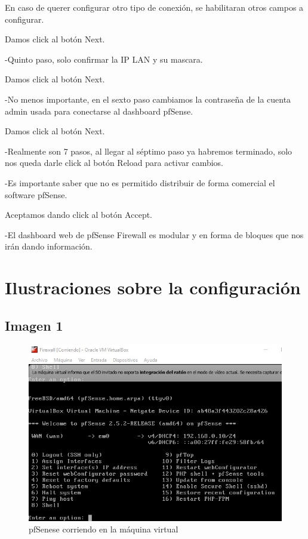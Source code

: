 \documentclass[12pt,letterspaper]{report}
\begin{document}
\vspace {0.3cm}
En caso de querer configurar otro tipo de conexión, se habilitaran otros campos a configurar.\par
\vspace {0.3cm}
Damos click al botón Next.\par
\vspace {0.3cm}
-Quinto paso, solo confirmar la IP LAN y su mascara.\par
\vspace {0.3cm}
Damos click al botón Next.\par
\vspace {0.3cm}
-No menos importante, en el sexto paso cambiamos la contraseña de la cuenta admin usada para conectarse al dashboard pfSense.\par
\vspace {0.3cm}
Damos click al botón Next.\par
\vspace {0.3cm}
-Realmente son 7 pasos, al llegar al séptimo paso ya habremos terminado, solo nos queda darle click al botón Reload para activar cambios.\par
\vspace {0.3cm}
-Es importante saber que no es permitido distribuir de forma comercial el software pfSense.\par
\vspace {0.3cm}
Aceptamos dando click al botón Accept.\par
\vspace {0.3cm}
-El dashboard web de pfSense Firewall es modular y en forma de bloques que nos irán dando información.\par
\vspace {0.3cm}

\part{Ilustraciones sobre la configuración}
\chapter*{Imagen 1}
\vspace {0.3cm}
\begin{figure}[htb]
\centering
\includegraphics[scale=0.5]{Img1.jpg}
\caption{pfSenese corriendo en la máquina virtual}
\end{figure}\par
\vspace {0.1cm}
\end{document}
